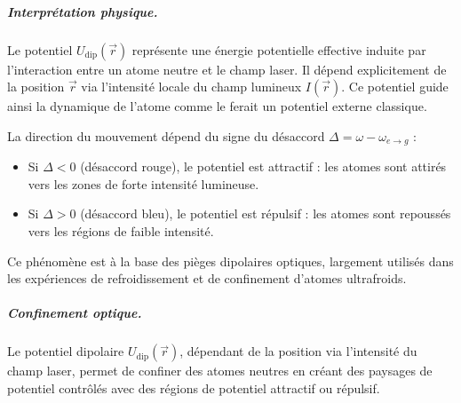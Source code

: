 


\subparagraph{Interprétation physique.}

Le potentiel \( U_{\mathrm{dip}}(\vec{r}) \) représente une énergie potentielle effective induite par l’interaction entre un atome neutre et le champ laser. Il dépend explicitement de la position \( \vec{r} \) via l’intensité locale du champ lumineux \( I(\vec{r}) \). Ce potentiel guide ainsi la dynamique de l’atome comme le ferait un potentiel externe classique.

La direction du mouvement dépend du signe du désaccord \( \Delta = \omega - \omega_{e \rightarrow g} \) :

\begin{itemize}[label =$\bullet$]
  \item Si \( \Delta < 0 \) (désaccord rouge), le potentiel est attractif : les atomes sont attirés vers les zones de forte intensité lumineuse.
  \item Si \( \Delta > 0 \) (désaccord bleu), le potentiel est répulsif : les atomes sont repoussés vers les régions de faible intensité.
\end{itemize}

Ce phénomène est à la base des pièges dipolaires optiques, largement utilisés dans les expériences de refroidissement et de confinement d’atomes ultrafroids.




\subparagraph{Confinement optique.}

Le potentiel dipolaire \( U_{\mathrm{dip}}(\vec{r}) \), dépendant de la position via l’intensité du champ laser, permet de confiner des atomes neutres en créant des paysages de potentiel contrôlés avec des régions de potentiel attractif ou répulsif.

